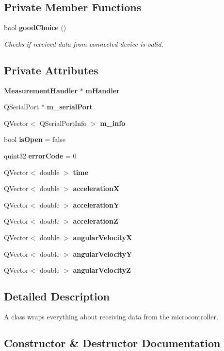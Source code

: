 \subsection*{Private Member Functions}
\begin{DoxyCompactItemize}
\item 
bool \textbf{ good\+Choice} ()
\begin{DoxyCompactList}\small\item\em Checks if received data from connected device is valid. \end{DoxyCompactList}\end{DoxyCompactItemize}
\subsection*{Private Attributes}
\begin{DoxyCompactItemize}
\item 
\textbf{ Measurement\+Handler} $\ast$ \textbf{ m\+Handler}
\item 
Q\+Serial\+Port $\ast$ \textbf{ m\+\_\+serial\+Port}
\item 
Q\+Vector$<$ Q\+Serial\+Port\+Info $>$ \textbf{ m\+\_\+info}
\item 
bool \textbf{ is\+Open} = false
\item 
quint32 \textbf{ error\+Code} = 0
\item 
Q\+Vector$<$ double $>$ \textbf{ time}
\item 
Q\+Vector$<$ double $>$ \textbf{ accelerationX}
\item 
Q\+Vector$<$ double $>$ \textbf{ accelerationY}
\item 
Q\+Vector$<$ double $>$ \textbf{ accelerationZ}
\item 
Q\+Vector$<$ double $>$ \textbf{ angular\+VelocityX}
\item 
Q\+Vector$<$ double $>$ \textbf{ angular\+VelocityY}
\item 
Q\+Vector$<$ double $>$ \textbf{ angular\+VelocityZ}
\end{DoxyCompactItemize}


\subsection{Detailed Description}
A class wraps everything about receiving data from the microcontroller. 

\subsection{Constructor \& Destructor Documentation}
\mbox{\label{class_serial_port_reader_aef65d0e76f65204aaa57ecfc144c827d}} 
